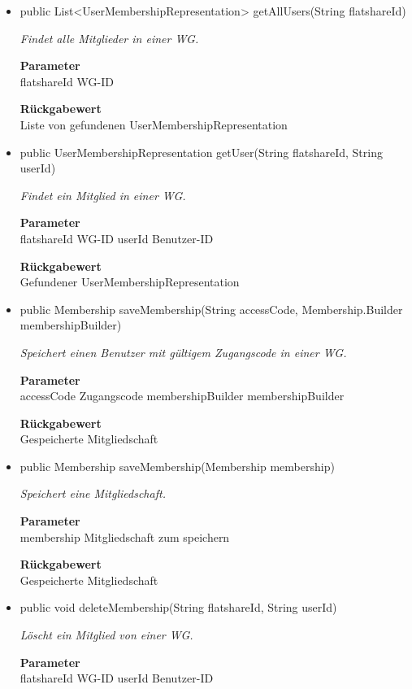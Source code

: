 \documentclass[a4paper]{scrreprt}
\begin{document}
        \begin{itemize}
        	\item{public List<UserMembershipRepresentation> getAllUsers(String flatshareId)}
        	
        	\textit{Findet alle Mitglieder in einer WG.}
        	
        	\textbf{Parameter} \\
        	flatshareId WG-ID
        	
        	\textbf{Rückgabewert} \\
        	Liste von gefundenen UserMembershipRepresentation        \item{public UserMembershipRepresentation getUser(String flatshareId, String userId)}
        	
        	\textit{Findet ein Mitglied in einer WG.}
        	
        	\textbf{Parameter} \\
        	flatshareId WG-ID
        	userId Benutzer-ID
        	
        	\textbf{Rückgabewert} \\
        	Gefundener UserMembershipRepresentation        \item{public Membership saveMembership(String accessCode, Membership.Builder membershipBuilder)}
        	
        	\textit{Speichert einen Benutzer mit gültigem Zugangscode in einer WG.}
        	
        	\textbf{Parameter} \\
        	accessCode Zugangscode
        	membershipBuilder membershipBuilder
        	
        	\textbf{Rückgabewert} \\
        	Gespeicherte Mitgliedschaft        \item{public Membership saveMembership(Membership membership)}
        	
        	\textit{Speichert eine Mitgliedschaft.}
        	
        	\textbf{Parameter} \\
        	membership Mitgliedschaft zum speichern
        	
        	\textbf{Rückgabewert} \\
        	Gespeicherte Mitgliedschaft        \item{public void deleteMembership(String flatshareId, String userId)}
        	
        	\textit{Löscht ein Mitglied von einer WG.}
        	
        	\textbf{Parameter} \\
        	flatshareId WG-ID
        	userId Benutzer-ID
        	
        	
        \end{itemize}
\end{document}
